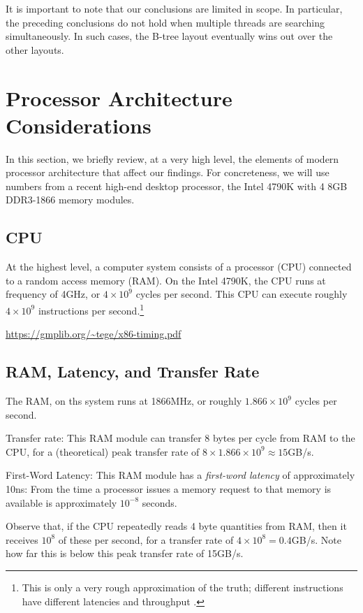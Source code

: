 \documentclass{patmorin}
\begin{document}
It is important to note that our conclusions are limited in scope. In
particular, the preceding conclusions do not hold when multiple threads
are searching simultaneously.  In such cases, the B-tree layout eventually
wins out over the other layouts.

\section{Processor Architecture Considerations}

In this section, we briefly review, at a very high level, the elements of
modern processor architecture that affect our findings.  For concreteness,
we will use numbers from a recent high-end desktop processor, the Intel
4790K \cite{S} with 4 8GB DDR3-1866 memory modules.

\subsection{CPU}

At the highest level, a computer system consists of a processor (CPU)
connected to a random access memory (RAM). On the Intel 4790K, the
CPU runs at frequency of 4GHz, or $4\times10^9$ cycles per second.
This CPU can execute roughly $4\times 10^{9}$ instructions per
second.\footnote{This is only a very rough approximation of the
truth; different instructions have different latencies and throughput
\cite{granlund.instruction}.}

\url{https://gmplib.org/~tege/x86-timing.pdf}


\subsection{RAM, Latency, and Transfer Rate}

The RAM, on ths system runs at 1866MHz, or roughly $1.866\times10^9$
cycles per second.

Transfer rate: This RAM module can transfer 8 bytes per cycle from RAM
to the CPU, for a (theoretical) peak transfer rate of 
$8\times 1.866\times10^9\approx 15$GB/s.

First-Word Latency: This RAM module has a \emph{first-word latency} of
approximately 10ns: From the time a processor issues a memory request
to that memory is available is approximately $10^{-8}$ seconds.

Observe that, if the CPU repeatedly reads 4 byte quantities from RAM,
then it receives $10^8$ of these per second, for a transfer rate of
$4\times 10^8=0.4$GB/s.  Note how far this is below this peak transfer
rate of 15GB/s.
\end{document}

